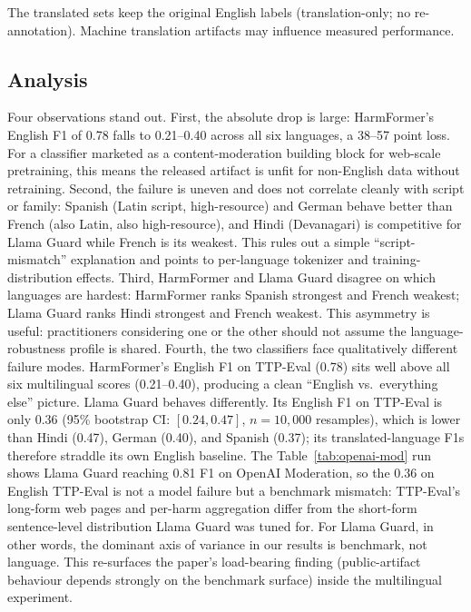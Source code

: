 \documentclass[10pt]{article} %
\begin{document}
The translated sets keep the original English labels (translation-only; no re-annotation). Machine translation artifacts may influence measured performance.

\subsection{Analysis}

Four observations stand out. First, the absolute drop is large: HarmFormer's English F1 of 0.78 falls to 0.21--0.40 across all six languages, a 38--57 point loss. For a classifier marketed as a content-moderation building block for web-scale pretraining, this means the released artifact is unfit for non-English data without retraining. Second, the failure is uneven and does not correlate cleanly with script or family: Spanish (Latin script, high-resource) and German behave better than French (also Latin, also high-resource), and Hindi (Devanagari) is competitive for Llama Guard while French is its weakest. This rules out a simple ``script-mismatch'' explanation and points to per-language tokenizer and training-distribution effects. Third, HarmFormer and Llama Guard disagree on which languages are hardest: HarmFormer ranks Spanish strongest and French weakest; Llama Guard ranks Hindi strongest and French weakest. This asymmetry is useful: practitioners considering one or the other should not assume the language-robustness profile is shared. Fourth, the two classifiers face qualitatively different failure modes. HarmFormer's English F1 on TTP-Eval (0.78) sits well above all six multilingual scores (0.21--0.40), producing a clean ``English vs.\ everything else'' picture. Llama Guard behaves differently. Its English F1 on TTP-Eval is only 0.36 (95\% bootstrap CI: $[0.24, 0.47]$, $n=10{,}000$ resamples), which is lower than Hindi (0.47), German (0.40), and Spanish (0.37); its translated-language F1s therefore straddle its own English baseline. The Table~\ref{tab:openai-mod} run shows Llama Guard reaching 0.81 F1 on OpenAI Moderation, so the 0.36 on English TTP-Eval is not a model failure but a benchmark mismatch: TTP-Eval's long-form web pages and per-harm aggregation differ from the short-form sentence-level distribution Llama Guard was tuned for. For Llama Guard, in other words, the dominant axis of variance in our results is benchmark, not language. This re-surfaces the paper's load-bearing finding (public-artifact behaviour depends strongly on the benchmark surface) inside the multilingual experiment.
\end{document}
